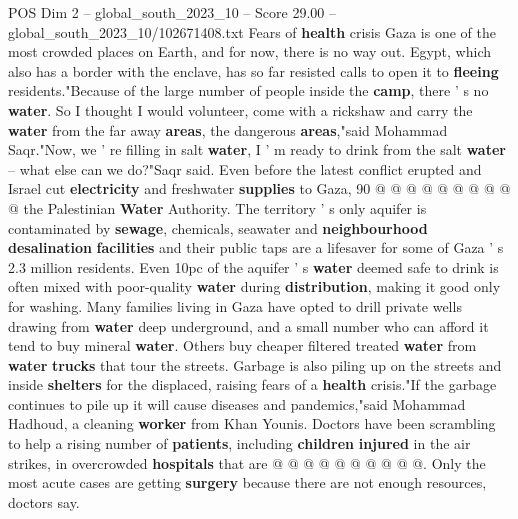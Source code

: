 \begin{textsample}{POS Dim 2 – global\_south\_2023\_10 – Score 29.00 – global\_south\_2023\_10/102671408.txt}
Fears of \textbf{health} crisis Gaza is one of the most crowded places on Earth, and for now, there is no way out.
Egypt, which also has a border with the enclave, has so far resisted calls to open it to \textbf{fleeing} residents."Because of the large number of people inside the \textbf{camp}, there ' s no \textbf{water}.
So I thought I would volunteer, come with a rickshaw and carry the \textbf{water} from the far away \textbf{areas}, the dangerous \textbf{areas},"said Mohammad Saqr."Now, we ' re filling in salt \textbf{water}, I ' m ready to drink from the salt \textbf{water} -- what else can we do?"Saqr said.
Even before the latest conflict erupted and Israel cut \textbf{electricity} and freshwater \textbf{supplies} to Gaza, 90 @ @ @ @ @ @ @ @ @ @ the Palestinian \textbf{Water} Authority.
The territory ' s only aquifer is contaminated by \textbf{sewage}, chemicals, seawater and \textbf{neighbourhood} \textbf{desalination} \textbf{facilities} and their public taps are a lifesaver for some of Gaza ' s 2.3 million residents.
Even 10pc of the aquifer ' s \textbf{water} deemed safe to drink is often mixed with poor-quality \textbf{water} during \textbf{distribution}, making it good only for washing.
Many families living in Gaza have opted to drill private wells drawing from \textbf{water} deep underground, and a small number who can afford it tend to buy mineral \textbf{water}.
Others buy cheaper filtered treated \textbf{water} from \textbf{water} \textbf{trucks} that tour the streets.
Garbage is also piling up on the streets and inside \textbf{shelters} for the displaced, raising fears of a \textbf{health} crisis."If the garbage continues to pile up it will cause diseases and pandemics,"said Mohammad Hadhoud, a cleaning \textbf{worker} from Khan Younis.
Doctors have been scrambling to help a rising number of \textbf{patients}, including \textbf{children} \textbf{injured} in the air strikes, in overcrowded \textbf{hospitals} that are @ @ @ @ @ @ @ @ @ @.
Only the most acute cases are getting \textbf{surgery} because there are not enough resources, doctors say.

\end{textsample}
